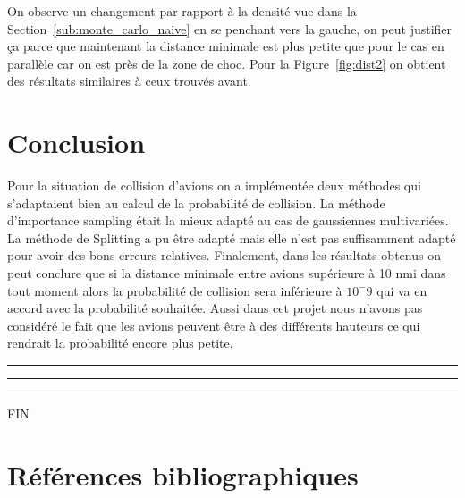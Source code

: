\documentclass[a4paper, 12pt,twoside]{article}
\numberwithin{equation}{subsection}
\begin{document}
	On observe un changement par rapport à la densité vue dans la Section~\ref{sub:monte_carlo_naive} en se penchant vers la gauche, on peut justifier ça parce que maintenant la distance minimale est plus petite que pour le cas en parallèle car on est près de la zone de choc. Pour la Figure~\ref{fig:dist2} on obtient des résultats similaires à ceux trouvés avant.
	
	
    \clearpage

    \section{Conclusion}
	
	Pour la situation de collision d'avions on a implémentée deux méthodes qui s'adaptaient bien au calcul de la probabilité de collision. La méthode d'importance sampling était la mieux adapté au cas de gaussiennes multivariées. La méthode de Splitting a pu être adapté mais elle n'est pas suffisamment adapté pour avoir des bons erreurs relatives. Finalement, dans les résultats obtenus on peut conclure que si la distance minimale entre avions supérieure à 10 nmi dans tout moment alors la probabilité de collision sera inférieure à $10^-9$ qui va en accord avec la probabilité souhaitée. Aussi dans cet projet nous n'avons pas considéré le fait que les avions peuvent être à des différents hauteurs ce qui rendrait la probabilité encore plus petite.


    \begin{center}
        \color{bleu303}

        \rule{0.3\textwidth}{0.2mm}\vspace*{-3.5mm}

        \rule{0.5\textwidth}{0.6mm}\vspace*{-3.8mm}

        \rule{0.3\textwidth}{0.2mm}\vspace*{-1mm}

        \sffamily FIN
    \end{center}
    
     \clearpage
        \section{Références bibliographiques}
        {
        \renewcommand{\section}[2]{}
        \nocite{*}
        
        
        }

    
\end{document}

